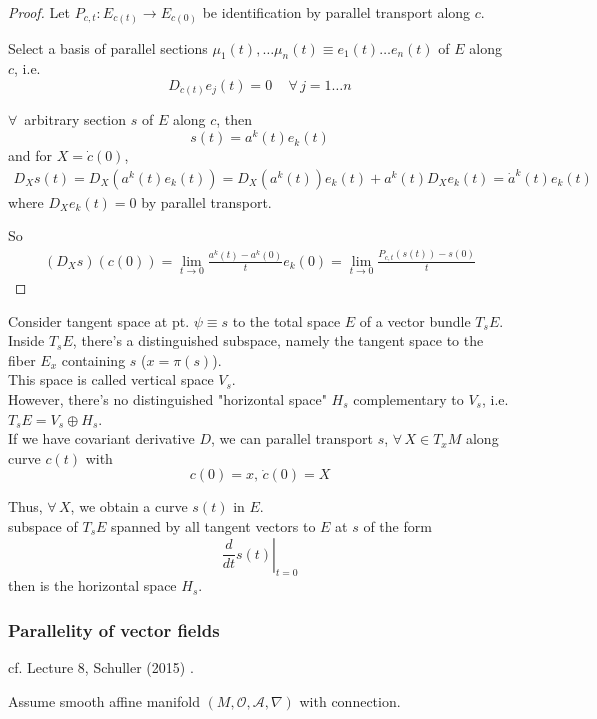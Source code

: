 \begin{proof}
	Let $P_{c,t} : E_{c(t)} \to E_{c(0)} $ be identification by parallel transport along $c$.
	
	Select a basis of parallel sections $\mu_1(t), \dots \mu_n(t) \equiv e_1(t) \dots e_n(t)$ of $E$ along $c$, i.e.
	\[
	D_{\dot{c}(t) } e_j(t) = 0 \quad \, \forall \, j = 1 \dots n
	\]
	
	$\forall \,$ arbitrary section $s$ of $E$ along $c$, then 
	\[
	s(t) = a^k(t) e_k(t)
	\]
	and for $X = \dot{c}(0)$,
	\[
	\begin{gathered}
		D_X s(t) = D_X(a^k(t) e_k(t)) = D_X(a^k(t)) e_k(t) + a^k(t) D_X e_k(t) = \dot{a}^k(t) e_k(t)
	\end{gathered}
	\]
	where $D_Xe_k(t)=0$ by parallel transport.
	
	So
	\[
	\begin{gathered}
		(D_Xs) (c(0)) = \lim_{t\to 0} \frac{a^k(t) - a^k(0) }{ t} e_k(0) = \lim_{t\to 0} \frac{ P_{c,t} (s(t)) - s(0) }{t}
	\end{gathered}
	\]
\end{proof}

Consider tangent space at pt. $\psi \equiv s$ to the total space $E$ of a vector bundle $T_sE$. \\
Inside $T_sE$, there's a distinguished subspace, namely the tangent space to the fiber $E_x$ containing $s$ ($x=\pi(s)$). \\
This space is called vertical space $V_s$. \\

However, there's no distinguished "horizontal space" $H_s$ complementary to $V_s$, i.e. $T_sE = V_s \oplus H_s$. \\
If we have covariant derivative $D$, we can parallel transport $s$, $\forall\, X \in T_xM$ along curve $c(t)$ with 
\[
c(0) = x, \, \dot{c}(0) = X
\]

Thus, $\forall \, X$, we obtain a curve $s(t) $ in $E$. \\
subspace of $T_sE$ spanned by all tangent vectors to $E$ at $s$ of the form
\[
\left. \frac{d}{dt} s(t) \right|_{t=0}
\]
then is the horizontal space $H_s$.

\subsubsection{Parallelity of vector fields}

cf. Lecture 8, Schuller (2015) \cite{dgdt:Schul2015}.

Assume smooth affine manifold $(M, \mathcal{O}, \mathcal{A}, \nabla)$ with connection.

